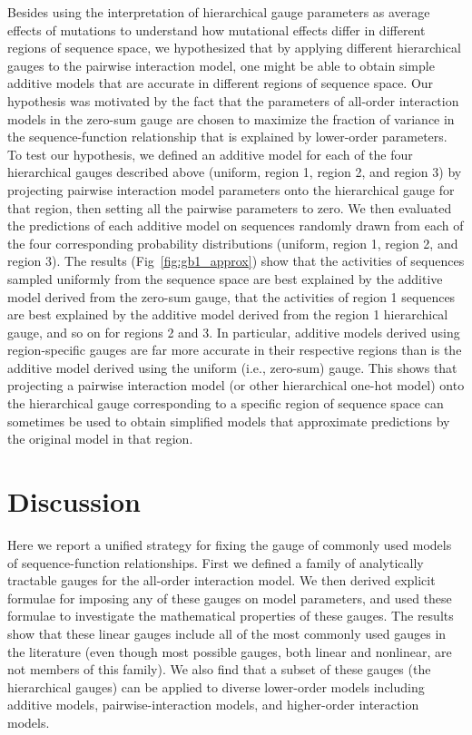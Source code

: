 \documentclass[10pt,letterpaper]{article}
\newcommand{\fig}[2]{Fig\ \ref{#1}#2}
\begin{document}
Besides using the interpretation of hierarchical gauge parameters as average effects of mutations to understand how mutational effects differ in different regions of sequence space, we hypothesized that by applying different hierarchical gauges to the pairwise interaction model, one might be able to obtain simple additive models that are accurate in different regions of sequence space. Our hypothesis was motivated by the fact that the parameters of all-order interaction models in the zero-sum gauge are chosen to maximize the fraction of variance in the sequence-function relationship that is explained by lower-order parameters. To test our hypothesis, we defined an additive model for each of the four hierarchical gauges described above (uniform, region 1, region 2, and region 3) by projecting pairwise interaction model parameters onto the hierarchical gauge for that region, then setting all the pairwise parameters to zero. We then evaluated the predictions of each additive model on sequences randomly drawn from each of the four corresponding probability distributions (uniform, region 1, region 2, and region 3). The results (\fig{fig:gb1_approx}) show that the activities of sequences sampled uniformly from the sequence space are best explained by the additive model derived from the zero-sum gauge, that the activities of region 1 sequences are best explained by the additive model derived from the region 1 hierarchical gauge, and so on for regions 2 and 3. In particular, additive models derived using region-specific gauges are far more accurate in their respective regions than is the additive model derived using the uniform (i.e., zero-sum) gauge. This shows that projecting a pairwise interaction model (or other hierarchical one-hot model) onto the hierarchical gauge corresponding to a specific region of sequence space can sometimes be used to obtain simplified models that approximate predictions by the original model in that region. 


\section*{Discussion}

Here we report a unified strategy for fixing the gauge of commonly used models of sequence-function relationships. First we defined a family of analytically tractable gauges for the all-order interaction model. We then derived explicit formulae for imposing any of these gauges on model parameters, and used these formulae to investigate the mathematical properties of these gauges. The results show that these linear gauges include all of the most commonly used gauges in the literature (even though most possible gauges, both linear and nonlinear, are not members of this family). We also find that a subset of these gauges (the hierarchical gauges) can be applied to diverse lower-order models including additive models, pairwise-interaction models, and higher-order interaction models.
\end{document}
